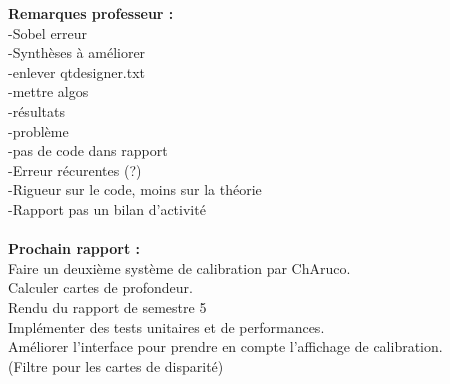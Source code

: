 \documentclass{article}
\begin{document}
\textbf{Remarques professeur :}\\
-Sobel erreur\\
-Synthèses à améliorer\\
-enlever qtdesigner.txt\\
-mettre algos\\
-résultats\\
-problème\\
-pas de code dans rapport\\
-Erreur récurentes (?)\\
-Rigueur sur le code, moins sur la théorie\\
-Rapport pas un bilan d'activité\\
\\

\textbf{Prochain rapport :}\\
Faire un deuxième système de calibration par ChAruco.\\
Calculer cartes de profondeur.\\
Rendu du rapport de semestre 5\\
Implémenter des tests unitaires et de performances.\\
Améliorer l'interface pour prendre en compte l'affichage de calibration.\\
(Filtre pour les cartes de disparité)\\
\\\\
\end{document}
